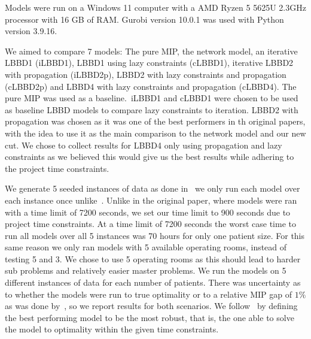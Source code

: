 Models were run on a Windows 11 computer with a AMD Ryzen 5 5625U 2.3GHz processor with 16 GB of RAM\@. Gurobi version 10.0.1 was used with Python version 3.9.16. 

We aimed to compare 7 models: The pure MIP, the network model, an iterative LBBD1 (iLBBD1), LBBD1 using lazy constraints (cLBBD1), iterative LBBD2 with propagation (iLBBD2p), LBBD2 with lazy constraints and propagation (cLBBD2p) and LBBD4 with lazy constraints and propagation (cLBBD4). The pure MIP was used as a baseline.\ iLBBD1 and cLBBD1  were chosen to be used as baseline LBBD models to compare lazy constraints to iteration. LBBD2 with propagation was chosen as it was one of the best performers in th original papers, with the idea to use it as the main comparison to the network model and our new cut. We chose to collect results for LBBD4 only using propagation and lazy constraints as we believed this would give us the best results while adhering to the project time constraints.

We generate 5 seeded instances of data as done in~\cite{roshanaei2017propagating} we only run each model over each instance once unlike~\cite{roshanaei2017propagating}. Unlike in the original paper, where models were ran with a time limit of 7200 seconds, we set our time limit to 900 seconds due to project time constraints. At a time limit of 7200 seconds the worst case time to run all models over all 5 instances was 70 hours for only one patient size. For this same reason we only ran models with 5 available operating rooms, instead of testing 5 and 3. We chose to use 5 operating rooms as this should lead to harder sub problems and relatively easier master problems\cite{roshanaei2017propagating}. We run the models on 5 different instances of data for each number of patients. There was uncertainty as to whether the models were run to true optimality or to a relative MIP gap of $1\%$ as was done by~\cite{guo}, so we report results for both scenarios. We follow~\cite{roshanaei2017propagating} by defining the best performing model to be the most robust, that is, the one able to solve the model to optimality within the given time constraints.



